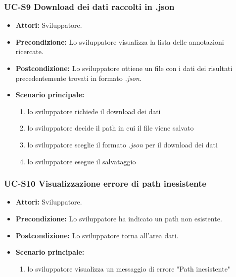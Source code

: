 \subsubsection{UC-S9 Download dei dati raccolti in .json}
		\begin{itemize}
			\item \textbf{Attori:} Sviluppatore.
			\item \textbf{Precondizione:} Lo sviluppatore visualizza la lista delle annotazioni ricercate.
			\item \textbf{Postcondizione:} Lo sviluppatore ottiene un file con i dati dei risultati precedentemente trovati in formato \textit{.json}.
			\item \textbf{Scenario principale:}
				\begin{enumerate}
					\item lo sviluppatore richiede il download dei dati
					\item lo sviluppatore decide il path in cui il file viene salvato
					\item lo sviluppatore sceglie il formato \textit{.json} per il download dei dati
					\item lo sviluppatore esegue il salvataggio
				\end{enumerate}
		\end{itemize}

\subsubsection{UC-S10 Visualizzazione errore di path inesistente}
		\begin{itemize}					
			\item \textbf{Attori:} Sviluppatore.
			\item \textbf{Precondizione:} Lo sviluppatore ha indicato un path non esistente.
			\item \textbf{Postcondizione:} Lo sviluppatore torna all'area dati.
			\item \textbf{Scenario principale:}
				\begin{enumerate}
					\item lo sviluppatore visualizza un messaggio di errore "Path inesistente"
				\end{enumerate}	
		\end{itemize}				
				
